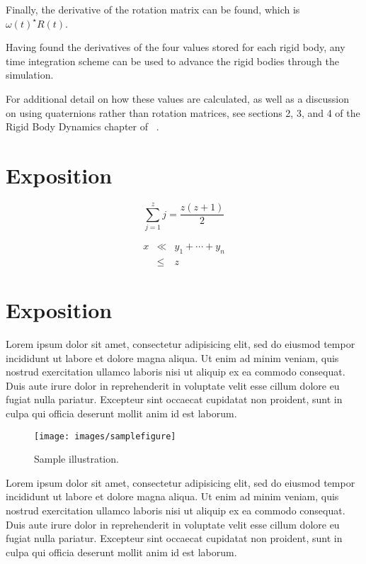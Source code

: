 \documentclass[tog]{acmsiggraph}
\begin{document}
Finally, the derivative of the rotation matrix can be found, which is $\omega(t)^{\star}R(t)$.

Having found the derivatives of the four values stored for each rigid body, any time integration scheme can be used to advance the rigid bodies through the simulation.

For additional detail on how these values are calculated, as well as a discussion on using quaternions rather than rotation matrices, see sections 2, 3, and 4 of the Rigid Body Dynamics chapter of ~\cite{pixarnotes}.

\section{Exposition}

\begin{equation}
 \sum_{j=1}^{z} j = \frac{z(z+1)}{2}
\end{equation}

\begin{eqnarray}
x & \ll & y_{1} + \cdots + y_{n} \\
  & \leq & z
\end{eqnarray}

\section{Exposition}

Lorem ipsum dolor sit amet, consectetur adipisicing elit, sed do
eiusmod tempor incididunt ut labore et dolore magna aliqua. Ut enim ad
minim veniam, quis nostrud exercitation ullamco laboris nisi ut
aliquip ex ea commodo consequat. Duis aute irure dolor in
reprehenderit in voluptate velit esse cillum dolore eu fugiat nulla
pariatur. Excepteur sint occaecat cupidatat non proident, sunt in
culpa qui officia deserunt mollit anim id est laborum.
\begin{figure}[ht]
  \centering
  \texttt{[image: images/samplefigure]}
  \caption{Sample illustration.}
\end{figure}
Lorem ipsum dolor sit amet, consectetur adipisicing elit, sed do
eiusmod tempor incididunt ut labore et dolore magna aliqua. Ut enim ad
minim veniam, quis nostrud exercitation ullamco laboris nisi ut
aliquip ex ea commodo consequat. Duis aute irure dolor in
reprehenderit in voluptate velit esse cillum dolore eu fugiat nulla
pariatur. Excepteur sint occaecat cupidatat non proident, sunt in
culpa qui officia deserunt mollit anim id est laborum.
\end{document}
